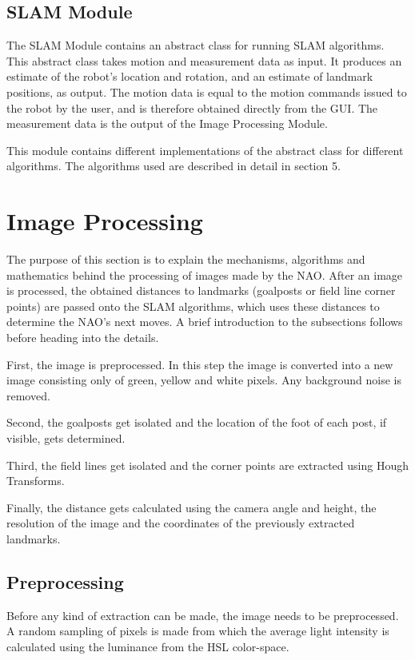 \documentclass{ba-kecs}
\numberwithin{figure}{section}
\numberwithin{equation}{section}
\begin{document}
\subsection{SLAM Module}
The SLAM Module contains an abstract class for running SLAM algorithms. This abstract class takes motion and measurement data as input. It produces an estimate of the robot's location and rotation, and an estimate of landmark positions, as output. The motion data is equal to the motion commands issued to the robot by the user, and is therefore obtained directly from the GUI. The measurement data is the output of the Image Processing Module.

This module contains different implementations of the abstract class for different algorithms. The algorithms used are described in detail in section 5.






\section{Image Processing}

The purpose of this section is to explain the mechanisms, algorithms and mathematics behind the processing of images made by the NAO.
After an image is processed, the obtained distances to landmarks (goalposts or field line corner points) are passed onto the SLAM algorithms, which uses these distances to determine the NAO's next moves.
A brief introduction to the subsections follows before heading into the details.

First, the image is preprocessed. In this step the image is converted into a new image consisting only of green, yellow and white pixels. Any background noise is removed.

Second, the goalposts get isolated and the location of the foot of each post, if visible, gets determined.

Third, the field lines get isolated and the corner points are extracted using Hough Transforms.

Finally, the distance gets calculated using the camera angle and height, the resolution of the image and the coordinates of the previously extracted landmarks.

\subsection{Preprocessing}
Before any kind of extraction can be made, the image needs to be preprocessed. A random sampling of pixels is made from which the average light intensity is calculated using the luminance from the HSL color-space.
\end{document}
